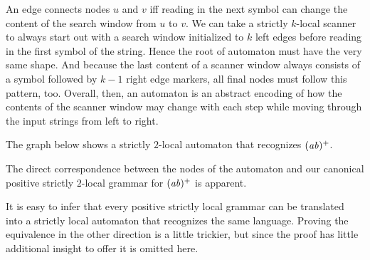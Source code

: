 An edge connects nodes $u$ and $v$ iff reading in the next symbol can change the content of the search window from $u$ to $v$.
We can take a strictly $k$-local scanner to always start out with a search window initialized to $k$ left edges before reading in the first symbol of the string.
Hence the root of automaton must have the very same shape.
And because the last content of a scanner window always consists of a symbol followed by $k-1$ right edge markers, all final nodes must follow this pattern, too.
Overall, then, an automaton is an abstract encoding of how the contents of the scanner window may change with each step while moving through the input strings from left to right.
%
\begin{examplebox}
    The graph below shows a strictly $2$-local automaton that recognizes $(\mathit{ab})^+$.
    \begin{center}
        
    \end{center}
    The direct correspondence between the nodes of the automaton and our canonical positive strictly $2$-local grammar for $(\mathit{ab})^+$ is apparent.
\end{examplebox}
%
It is easy to infer that every positive strictly local grammar can be translated into a strictly local automaton that recognizes the same language.
Proving the equivalence in the other direction is a little trickier, but since the proof has little additional insight to offer it is omitted here.


